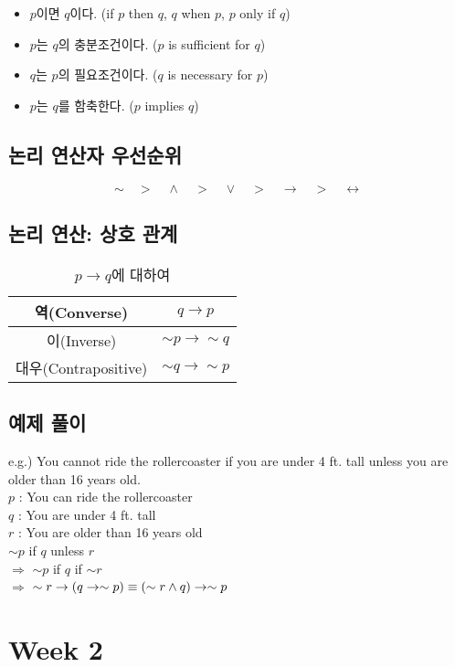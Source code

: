 \newpage
\begin{itemize}
    \item $p$이면 $q$이다. (if $p$ then $q$, $q$ when $p$, $p$ only if $q$)
    \item $p$는 $q$의 충분조건이다. ($p$ is sufficient for $q$)
    \item $q$는 $p$의 필요조건이다. ($q$ is necessary for $p$)
    \item $p$는 $q$를 함축한다. ($p$ implies $q$)
\end{itemize}

\subsection{논리 연산자 우선순위}
$$\sim\quad>\quad\land\quad>\quad\lor\quad>\quad\to\quad>\quad\leftrightarrow$$
\subsection{논리 연산: 상호 관계}
\begin{table}[]
    \caption {$p\to q$에 대하여}
    \centering
    \begin{tabular}{c|c}
        역(Converse)&$q\to p$\\
        \hline
        이(Inverse)&$\sim p \to \sim q$\\
        \hline
        대우(Contrapositive)&$\sim q \to \sim p$
    \end{tabular}
\end{table}
\subsection{예제 풀이}
e.g.) You cannot ride the rollercoaster if you are under 4 ft. tall unless you are older than 16 years old.\\
$p$ : You can ride the rollercoaster\\
$q$ : You are under 4 ft. tall\\
$r$ : You are older than 16 years old\\
$\sim p$ if $q$ unless $r$\\$\Rightarrow$ $\sim p$ if $q$ if $\sim r$\\$\Rightarrow$ $\sim r \to (q \to \sim p)\\\equiv (\sim r \land q) \to \sim p$\\
\newpage
\section{Week 2}
